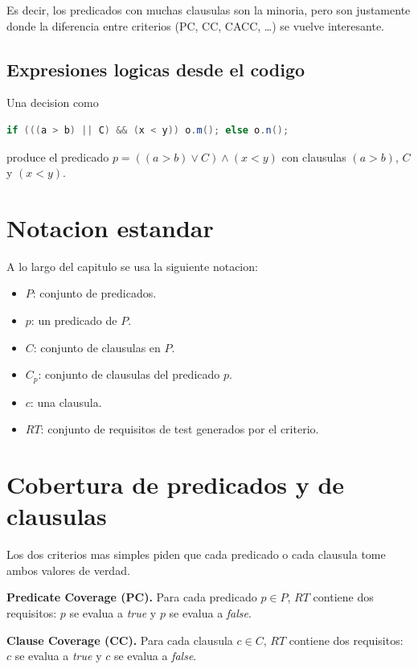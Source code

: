 \documentclass[12pt,a4paper]{article}
\begin{document}
Es decir, los predicados con muchas clausulas son la minoria, pero son justamente donde la
diferencia entre criterios (PC, CC, CACC, \ldots) se vuelve interesante.

\subsection{Expresiones logicas desde el codigo}

Una decision como
\begin{lstlisting}[style=codestyle,language=Java]
if (((a > b) || C) && (x < y)) o.m(); else o.n();
\end{lstlisting}
produce el predicado $p = ((a>b) \vee C) \wedge (x<y)$ con clausulas $(a>b)$, $C$ y $(x<y)$.

\section{Notacion estandar}

\begin{definicionbox}
A lo largo del capitulo se usa la siguiente notacion:
\begin{itemize}
  \item $P$: conjunto de predicados.
  \item $p$: un predicado de $P$.
  \item $C$: conjunto de clausulas en $P$.
  \item $C_p$: conjunto de clausulas del predicado $p$.
  \item $c$: una clausula.
  \item $\textit{RT}$: conjunto de requisitos de test generados por el criterio.
\end{itemize}
\end{definicionbox}

\section{Cobertura de predicados y de clausulas}

Los dos criterios mas simples piden que cada predicado o cada clausula tome ambos valores de
verdad.

\begin{definicionbox}
\textbf{Predicate Coverage (PC).} Para cada predicado $p \in P$, $RT$ contiene dos requisitos:
$p$ se evalua a \textit{true} y $p$ se evalua a \textit{false}.
\end{definicionbox}

\begin{definicionbox}
\textbf{Clause Coverage (CC).} Para cada clausula $c \in C$, $RT$ contiene dos requisitos: $c$
se evalua a \textit{true} y $c$ se evalua a \textit{false}.
\end{definicionbox}
\end{document}
